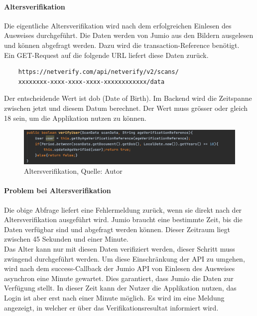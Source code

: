 \paragraph{Altersverifikation}
Die eigentliche Altersverifikation wird nach dem erfolgreichen Einlesen des Ausweises durchgeführt. Die Daten werden von Jumio aus den Bildern ausgelesen und können abgefragt werden. Dazu wird die transaction-Reference benötigt. \\
Ein GET-Request auf die folgende URL liefert diese Daten zurück. 
\begin{verbatim}
	https://netverify.com/api/netverify/v2/scans/
	xxxxxxxx-xxxx-xxxx-xxxx-xxxxxxxxxxxx/data
\end{verbatim}
Der entscheidende Wert ist dob (Date of Birth). Im Backend wird die Zeitspanne zwischen jetzt und diesem Datum berechnet. Der Wert muss grösser oder gleich 18 sein, um die Applikation nutzen zu können. 
 \begin{figure}[H]
	\centering
	\includegraphics[width=1\textwidth]{images/dob.PNG}
	\caption[Altersverifikation]{Altersverifikation, Quelle: Autor}
	\label{img: dob}
\end{figure} 
 
\paragraph{Problem bei Altersverifikation}
Die obige Abfrage liefert eine Fehlermeldung zurück, wenn sie direkt nach der Altersverifikation ausgeführt wird. Jumio braucht eine bestimmte Zeit, bis die Daten verfügbar sind und abgefragt werden können. Dieser Zeitraum liegt zwischen 45 Sekunden und einer Minute. \\
Das Alter kann nur mit diesen Daten verifiziert werden, dieser Schritt muss zwingend durchgeführt werden. Um diese Einschränkung der API zu umgehen, wird nach dem success-Callback der Jumio API von Einlesen des Ausweises asynchron eine Minute gewartet. Dies garantiert, dass Jumio die Daten zur Verfügung stellt. In dieser Zeit kann der Nutzer die Applikation nutzen, das Login ist aber erst nach einer Minute möglich. Es wird im eine Meldung angezeigt, in welcher er über das Verifikationsresultat informiert wird. \\\\



